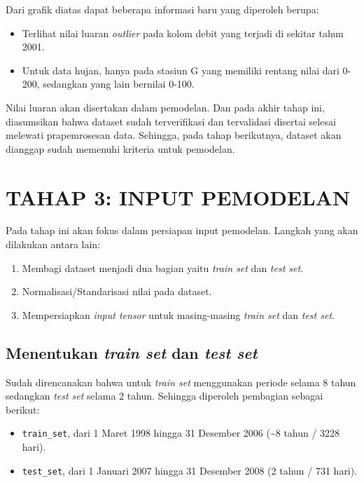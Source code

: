 \documentclass[11pt]{article}
\providecommand{\tightlist}{%
      \setlength{\itemsep}{0pt}\setlength{\parskip}{0pt}}
\let\oldsection\section
\renewcommand\section{\clearpage\oldsection}
\begin{document}
    Dari grafik diatas dapat beberapa informasi baru yang diperoleh berupa:

\begin{itemize}
\tightlist
\item
  Terlihat nilai luaran \emph{outlier} pada kolom debit yang terjadi di
  sekitar tahun 2001.
\item
  Untuk data hujan, hanya pada stasiun G yang memiliki rentang nilai
  dari 0-200, sedangkan yang lain bernilai 0-100.
\end{itemize}

Nilai luaran akan disertakan dalam pemodelan. Dan pada akhir tahap ini,
diasumsikan bahwa dataset sudah terverifikasi dan tervalidasi disertai
selesai melewati prapemrosesan data. Sehingga, pada tahap berikutnya,
dataset akan dianggap sudah memenuhi kriteria untuk pemodelan.

    \hypertarget{tahap-3-input-pemodelan}{%
\section{TAHAP 3: INPUT PEMODELAN}\label{tahap-3-input-pemodelan}}

Pada tahap ini akan fokus dalam persiapan input pemodelan. Langkah yang
akan dilakukan antara lain:

\begin{enumerate}
\def\labelenumi{\arabic{enumi}.}
\tightlist
\item
  Membagi dataset menjadi dua bagian yaitu \emph{train set} dan
  \emph{test set}.
\item
  Normalisasi/Standarisasi nilai pada dataset.
\item
  Mempersiapkan \emph{input tensor} untuk masing-masing \emph{train set}
  dan \emph{test set}.
\end{enumerate}

    \hypertarget{menentukan-train-set-dan-test-set}{%
\subsection{\texorpdfstring{Menentukan \emph{train set} dan \emph{test
set}}{Menentukan train set dan test set}}\label{menentukan-train-set-dan-test-set}}

Sudah direncanakan bahwa untuk \emph{train set} menggunakan periode
selama 8 tahun sedangkan \emph{test set} selama 2 tahun. Sehingga
diperoleh pembagian sebagai berikut:

\begin{itemize}
\tightlist
\item
  \texttt{train\_set}, dari 1 Maret 1998 hingga 31 Desember 2006
  (\textasciitilde{}8 tahun / 3228 hari).
\item
  \texttt{test\_set}, dari 1 Januari 2007 hingga 31 Desember 2008 (2
  tahun / 731 hari).
\end{itemize}
\end{document}
